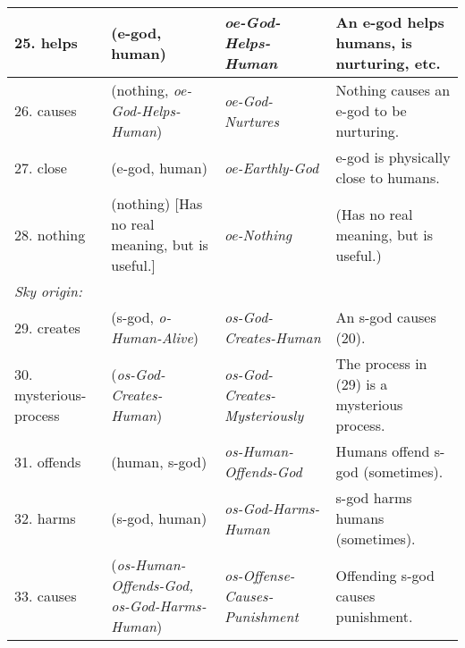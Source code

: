 \documentclass[12pt,xcolor=svgnames]{beamer}
\begin{document}
\begin{frame}
{{\begin{tabular}{llll}
\hline 25. helps &\hspace{-3ex} (e-god, human) &\hspace{-3ex}  \em oe-God-Helps-Human &\hspace{-3ex} An e-god helps humans, is nurturing, etc. \\
\hline 26. causes &\hspace{-3ex} (nothing, {\em oe-God-Helps-Human}) &\hspace{-3ex}  \em oe-God-Nurtures &\hspace{-3ex} Nothing causes an e-god to be nurturing. \\
\hline 27. close &\hspace{-3ex} (e-god, human) &\hspace{-3ex}  \em oe-Earthly-God &\hspace{-3ex} e-god is physically close to humans. \\
\hline 28. nothing &\hspace{-3ex} (nothing) [Has no real meaning, but is useful.]&\hspace{-3ex}  \em oe-Nothing &\hspace{-3ex}  (Has no real meaning, but is useful.) \\
\hline\hline
\em Sky origin: \\
\hline 29. creates &\hspace{-3ex} (s-god, {\em o-Human-Alive}) &\hspace{-3ex}  \em os-God-Creates-Human &\hspace{-3ex} An s-god causes (20). \\
\hline 30. mysterious-process &\hspace{-3ex} ({\em os-God-Creates-Human}) &\hspace{-3ex}  \em os-God-Creates-Mysteriously &\hspace{-3ex} The process in (29) is a mysterious process. \\
\hline 31. offends &\hspace{-3ex} (human, s-god) &\hspace{-3ex}  \em os-Human-Offends-God &\hspace{-3ex} Humans offend s-god (sometimes). \\
\hline 32. harms &\hspace{-3ex} (s-god, human) &\hspace{-3ex}  \em os-God-Harms-Human &\hspace{-3ex} s-god harms humans (sometimes). \\
\hline 33. causes &\hspace{-3ex} ({\em os-Human-Offends-God,\, os-God-Harms-Human}) &\hspace{-3ex}  \em os-Offense-Causes-Punishment &\hspace{-3ex} Offending s-god causes punishment. \\

\end{tabular}}}
\end{frame}
\end{document}
